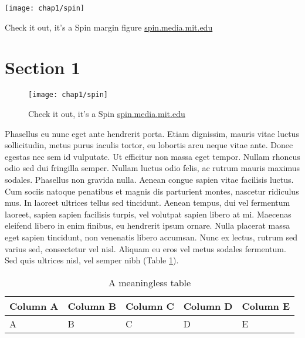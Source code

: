 \begin{marginfigure}[{-1cm}]
 	\texttt{[image: chap1/spin]}               
 	 \caption{Check it out, it's a Spin margin figure \url{spin.media.mit.edu}}
  	\label{fig:spin_margin}
\end{marginfigure}

\section{Section 1}

\begin{figure}[htb]
 	\texttt{[image: chap1/spin]}               
 	 \caption{Check it out, it's a Spin \url{spin.media.mit.edu}}
  	\label{fig:spin}
\end{figure}

Phasellus eu nunc eget ante hendrerit porta. Etiam dignissim, mauris vitae luctus sollicitudin, metus purus iaculis tortor, eu lobortis arcu neque vitae ante. Donec egestas nec sem id vulputate. Ut efficitur non massa eget tempor. Nullam rhoncus odio sed dui fringilla semper. Nullam luctus odio felis, ac rutrum mauris maximus sodales. Phasellus non gravida nulla. Aenean congue sapien vitae facilisis luctus. Cum sociis natoque penatibus et magnis dis parturient montes, nascetur ridiculus mus. In laoreet ultrices tellus sed tincidunt. Aenean tempus, dui vel fermentum laoreet, sapien sapien facilisis turpis, vel volutpat sapien libero at mi. Maecenas eleifend libero in enim finibus, eu hendrerit ipsum ornare. Nulla placerat massa eget sapien tincidunt, non venenatis libero accumsan. Nunc ex lectus, rutrum sed varius sed, consectetur vel nisl. Aliquam eu eros vel metus sodales fermentum. Sed quis ultrices nisl, vel semper nibh (Table \ref{tab:sample_table}).

\begin{table}
  \centering
  \begin{tabular}{l l l l l}
    Column A & Column B & Column C & Column D & Column E \\
    \toprule
    A & B & C & D & E
  \end{tabular}
  \caption{A meaningless table}
  \label{tab:sample_table}
\end{table}

